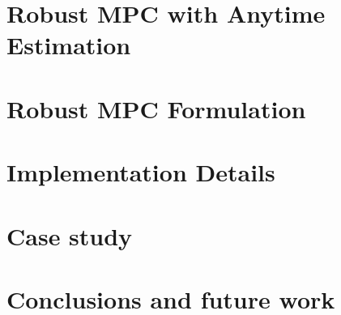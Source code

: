 \documentclass[letterpaper, 10pt, conference]{ieeeconf}
\begin{document}
\section{Robust MPC with Anytime Estimation}
\label{sec:RMPC}%


\section{Robust MPC Formulation}
\label{sec:RMPC-Formulation}


\section{Implementation Details} \label{sec:implementation}


%

\section{Case study} \label{sec:case} %



\section{Conclusions and future work} \label{sec:conclusion}


\appendix




% 




%

\end{document}
